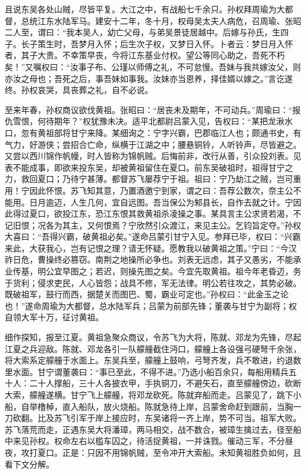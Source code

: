 且说东吴各处山贼，尽皆平复。大江之中，有战船七千余只。孙权拜周瑜为大都督，总统江东水陆军马。建安十二年，冬十月，权母吴太夫人病危，召周瑜、张昭二人至，谓曰：“我本吴人，幼亡父母，与弟吴景徒居越中。后嫁与孙氏，生四子。长子策生时，吾梦月入怀；后生次子权，又梦日入怀。卜者云：梦日月入怀者，其子大贵。不幸策早丧，今将江东基业付权。望公等同心助之，吾死不朽矣！”又嘱权曰：“汝事子布、公瑾以师傅之礼，不可怠慢。吾妹与我共嫁汝父，则亦汝之母也；吾死之后，事吾妹如事我。汝妹亦当恩养，择佳婿以嫁之。”言讫遂终。孙权哀哭，具丧葬之礼，自不必说。

至来年春，孙权商议欲伐黄祖。张昭曰：“居丧未及期年，不可动兵。”周瑜曰：“报仇雪恨，何待期年？”权犹豫未决。适平北都尉吕蒙入见，告权曰：“某把龙湫水口，忽有黄祖部将甘宁来降。某细询之：宁字兴霸，巴郡临江人也；颇通书史，有气力，好游侠；尝招合亡命，纵横于江湖之中；腰悬铜铃，人听铃声，尽皆避之。又尝以西川锦作帆幔，时人皆称为锦帆贼。后悔前非，改行从善，引众投刘表。见表不能成事，即欲来投东吴，却被黄祖留住在夏口。前东吴破祖时，祖得甘宁之力，救回夏口；乃待宁甚薄。都督苏飞屡荐宁于祖。祖曰：宁乃劫江之贼，岂可重用！宁因此怀恨。苏飞知其意，乃置酒邀宁到家，谓之曰：吾荐公数次，奈主公不能用。日月逾迈，人生几何，宜自远图。吾当保公为邾县长，自作去就之计。宁因此得过夏口，欲投江东，恐江东恨其救黄祖杀凌操之事。某具言主公求贤若渴，不记旧恨；况各为其主，又何恨焉？宁欣然引众渡江，来见主公。乞钧旨定夺。”孙权大喜曰：“吾得兴霸，破黄祖必矣。”遂命吕蒙引甘宁入见。参拜已毕，权曰：“兴霸来此，大获我心，岂有记恨之理？请无怀疑。愿教我以破黄祖之策。”宁曰：“今汉祚日危，曹操终必篡窃。南荆之地操所必争也。刘表无远虑，其子又愚劣，不能承业传基，明公宜早图之；若迟，则操先图之矣。今宜先取黄祖。祖今年老昏迈，务于货利；侵求吏民，人心皆怨；战具不修，军无法律。明公若往攻之，其势必破。既破祖军，鼓行而西，据楚关而图巴、蜀，霸业可定也。”孙权曰：“此金玉之论也！”遂命周瑜为大都督，总水陆军兵；吕蒙为前部先锋；董袭与甘宁为副将；权自领大军十万，征讨黄祖。

细作探知，报至江夏。黄祖急聚众商议，令苏飞为大将，陈就、邓龙为先锋，尽起江夏之兵迎敌。陈就、邓龙各引一队艨艟截住沔口，艨艟上各设强弓硬弩千余张，将大索系定艨艟于水面上。东吴兵至，艨艟上鼓响，弓弩齐发，兵不敢进，约退数里水面。甘宁谓董袭曰：“事已至此，不得不进。”乃选小船百余只，每船用精兵五十人：二十人撑船，三十人各披衣甲，手执铜刀，不避矢石，直至艨艟傍边，砍断大索，艨艟遂横。甘宁飞上艨艟，将邓龙砍死。陈就弃船而走。吕蒙见了，跳下小船，自举橹棹，直入船队，放火烧船。陈就急待上岸，吕蒙舍命赶到跟前，当胸一刀砍翻。比及苏飞引军于岸上接应时，东吴诸将一齐上岸，势不可当。祖军大败。苏飞落荒而走，正遇东吴大将潘璋，两马相交，战不数合，被璋生擒过去，径至船中来见孙权。权命左右以槛车囚之，待活捉黄祖，一并诛戮。催动三军，不分昼夜，攻打夏口。正是：只因不用锦帆贼，至令冲开大索船。未知黄祖胜负如何，且看下文分解。